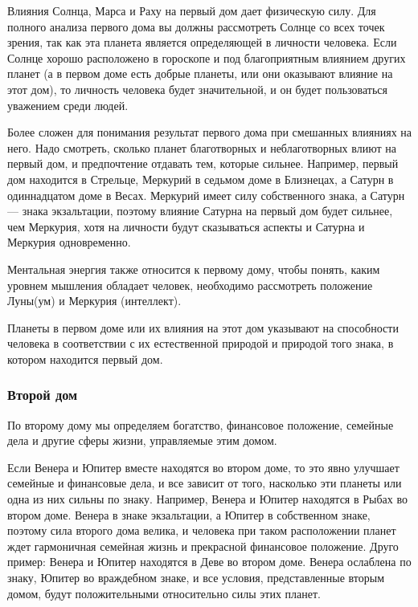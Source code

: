 Влияния Солнца, Марса и Раху на первый дом дает физическую силу. Для полного анализа первого дома вы должны рассмотреть Солнце со всех точек зрения, так как эта планета является определяющей в личности человека. Если Солнце хорошо расположено в гороскопе и под благоприятным влиянием других планет (а в первом доме есть добрые планеты, или они оказывают влияние на этот дом), то личность человека будет значительной, и он будет пользоваться уважением среди людей.

Более сложен для понимания результат первого дома при смешанных влияниях на него. Надо смотреть, сколько планет благотворных и неблаготворных влиют на первый дом, и предпочтение отдавать тем, которые сильнее. Например, первый дом находится в Стрельце, Меркурий в седьмом доме в Близнецах, а Сатурн в одиннадцатом доме в Весах. Меркурий имеет силу собственного знака, а Сатурн --- знака экзальтации, поэтому влияние Сатурна на первый дом будет сильнее, чем Меркурия, хотя на личности будут сказываться аспекты и Сатурна и Меркурия одновременно.

Ментальная энергия также относится к первому дому, чтобы понять, каким уровнем мышления обладает человек, необходимо рассмотреть положение Луны(ум) и Меркурия (интеллект).

Планеты в первом доме или их влияния на этот дом указывают на способности человека в соответствии с их естественной природой и природой того знака, в котором находится первый дом.

\subsubsection*{Второй дом}

По второму дому мы определяем богатство, финансовое положение, семейные дела и другие сферы жизни, управляемые этим домом.

Если Венера и Юпитер вместе находятся во втором доме, то это явно улучшает семейные и финансовые дела, и все зависит от того, насколько эти планеты или одна из них сильны по знаку. Например, Венера и Юпитер находятся в Рыбах во втором доме. Венера в знаке экзальтации, а Юпитер в собственном знаке, поэтому сила второго дома велика, и человека при таком расположении планет ждет гармоничная семейная жизнь и прекрасной финансовое положение. Друго пример: Венера и Юпитер находятся в Деве во втором доме. Венера ослаблена по знаку, Юпитер во враждебном знаке, и все условия, представленные вторым домом, будут положительными относительно силы этих планет.

